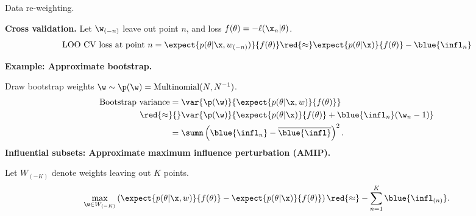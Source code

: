 



\begin{frame}[t]{Data re-weighting.}

    
    
    
    \pause
    \textbf{Cross validation.} 
    Let $\w_{(-n)}$ leave out point $n$, and loss
    $f(\theta) = -\ell(\x_n \vert \theta)$.
    \begin{align*}
    \textrm{LOO CV loss at point }n =
        \expect{p(\theta \vert \x, w_{(-n)})}{f(\theta)}
    \red{\approx} 
        \expect{p(\theta \vert \x)}{f(\theta)} - \blue{\infl_{n}}
    \end{align*}
    
    
    
    \pause
    \textbf{Example: Approximate bootstrap.}
    
    Draw bootstrap
    weights $\w \sim \p(\w) = \textrm{Multinomial}(N, N^{-1})$.
    \begin{align*}
    \textrm{Bootstrap variance} ={}&
    \var{\p(\w)}{\expect{p(\theta \vert \x, w)}{f(\theta)}} 
    \\\red{\approx}{}&
      \var{\p(\w)}{\expect{p(\theta \vert \x)}{f(\theta)} + \blue{\infl_n}(\w_n - 1)} 
    \\={}& \sumn \left(\blue{\infl_n} - \overline{\blue{\infl}}\right)^2.
    \end{align*}
    \pause
    \textbf{Influential subsets:
    Approximate maximum influence perturbation (AMIP).}
    
    Let $W_{(-K)}$ denote weights leaving out $K$ points.
    \begin{align*}
    \max_{\w \in W_{(-K)}} \left(
    \expect{p(\theta \vert \x, w)}{f(\theta)} -
    \expect{p(\theta \vert \x)}{f(\theta)}
    \right) \red{\approx} - \sum_{n=1}^K \blue{\infl_{(n)}}.
    \end{align*}
    
    
\end{frame}
    

    



